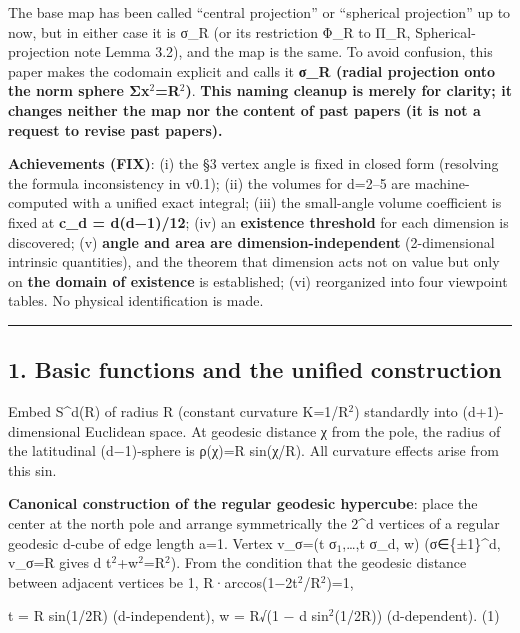 \documentclass[
]{ltjsarticle}
\begin{document}
The base map has been called ``central projection'' or ``spherical
projection'' up to now, but in either case it is σ\_R (or its
restriction Φ\_R to Π\_R, Spherical-projection note Lemma 3.2), and the
map is the same. To avoid confusion, this paper makes the codomain
explicit and calls it \textbf{σ\_R (radial projection onto the norm
sphere Σx\(^{2}\)=R\(^{2}\))}. \textbf{This naming cleanup is merely for
clarity; it changes neither the map nor the content of past papers (it
is not a request to revise past papers).}

\textbf{Achievements (FIX)}: (i) the §3 vertex angle is fixed in closed
form (resolving the formula inconsistency in v0.1); (ii) the volumes for
d=2--5 are machine-computed with a unified exact integral; (iii) the
small-angle volume coefficient is fixed at \textbf{c\_d = d(d−1)/12};
(iv) an \textbf{existence threshold} for each dimension is discovered;
(v) \textbf{angle and area are dimension-independent} (2-dimensional
intrinsic quantities), and the theorem that dimension acts not on value
but only on \textbf{the domain of existence} is established; (vi)
reorganized into four viewpoint tables. No physical identification is
made.

\begin{center}\rule{0.5\linewidth}{0.5pt}\end{center}

\subsection{1. Basic functions and the unified
construction}\label{basic-functions-and-the-unified-construction}

Embed S\^{}d(R) of radius R (constant curvature K=1/R\(^{2}\))
standardly into (d+1)-dimensional Euclidean space. At geodesic distance
χ from the pole, the radius of the latitudinal (d−1)-sphere is ρ(χ)=R
sin(χ/R). All curvature effects arise from this sin.

\textbf{Canonical construction of the regular geodesic hypercube}: place
the center at the north pole and arrange symmetrically the 2\^{}d
vertices of a regular geodesic d-cube of edge length a=1. Vertex v\_σ=(t
σ\(_{1}\),\ldots,t σ\_d, w) (σ∈\{±1\}\^{}d, \textbar v\_σ\textbar=R
gives d t\(^{2}\)+w\(^{2}\)=R\(^{2}\)). From the condition that the
geodesic distance between adjacent vertices be 1,
R·arccos(1−2t\(^{2}\)/R\(^{2}\))=1,

t = R sin(1/2R) (d-independent), w = R√(1 − d sin\(^{2}\)(1/2R))
(d-dependent). (1)
\end{document}
